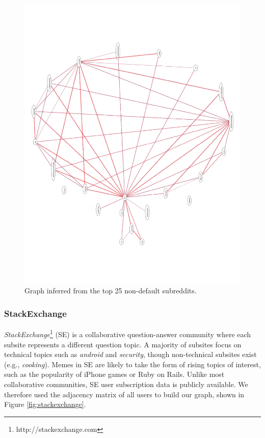 \documentclass{article} %
\begin{document}
\begin{figure}[htb]
\centering
\includegraphics[width=\textwidth]{reddit.pdf}
\caption{Graph inferred from the top 25 non-default subreddits.}
\label{fig:reddit}
\end{figure}

\subsubsection{StackExchange}
\textit{StackExchange}\footnote{http://stackexchange.com} (SE) is a collaborative question-answer community where each subsite represents a different question topic. A majority of subsites focus on technical topics such as \textit{android} and \textit{security}, though non-technical subsites exist (e.g., \textit{cooking}). Memes in SE are likely to take the form of rising topics of interest, such as the popularity of iPhone games or Ruby on Rails. Unlike most collaborative communities, SE user subscription data is publicly available. We therefore used the adjacency matrix of all users to build our graph, shown in Figure \ref{fig:stackexchange}.
\end{document}
